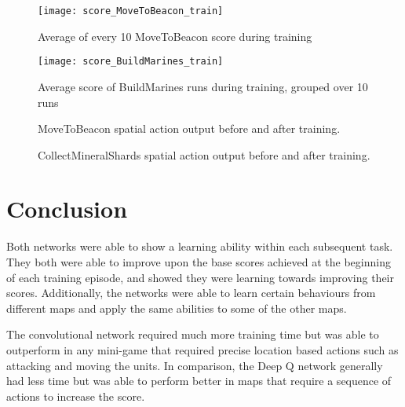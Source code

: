 \begin{figure}[h]
  \centering
  \begin{minipage}[b]{0.45\textwidth}
    \texttt{[image: score\_MoveToBeacon\_train]}
    \caption{Average of every 10 MoveToBeacon score during training}%
    \label{fig:dqn-scores-1}%
  \end{minipage}
  \hfill
  \begin{minipage}[b]{0.45\textwidth}
    \texttt{[image: score\_BuildMarines\_train]}
    \caption{Average score of BuildMarines runs during training, grouped over 10
    runs}%
    \label{fig:dqn-scores-2}
  \end{minipage}
\end{figure}

\begin{figure}[h]
    \centering
    \caption{MoveToBeacon spatial action output before and after training.}%
    \label{fig:cnn-filter1}%
\end{figure}

\begin{figure}[h]
    \centering
    \caption{CollectMineralShards spatial action output before and after training.}%
    \label{fig:cnn-filter2}%
\end{figure}

\section{Conclusion}

Both networks were able to show a learning ability within each subsequent task.
They both were able to improve upon the base scores achieved at the beginning of
each training episode, and showed they were learning towards improving their
scores. Additionally, the networks were able to learn certain behaviours from
different maps and apply the same abilities to some of the other maps.

The convolutional network required much more training time but was able to
outperform in any mini-game that required precise location based actions such as
attacking and moving the units. In comparison, the Deep Q network generally had
less time but was able to perform better in maps that require a sequence of
actions to increase the score.

